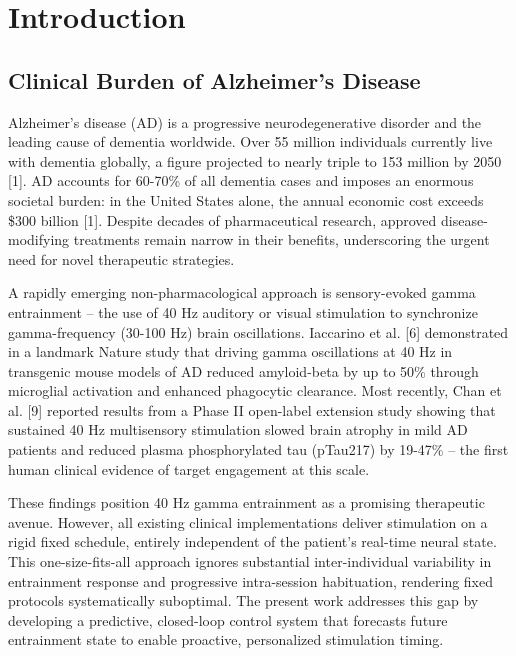 \documentclass[11pt,letterpaper]{article}
\begin{document}
\section{Introduction}

\subsection{Clinical Burden of Alzheimer's Disease}

Alzheimer's disease (AD) is a progressive neurodegenerative disorder and the leading cause of dementia worldwide. Over 55 million individuals currently live with dementia globally, a figure projected to nearly triple to 153 million by 2050 [1]. AD accounts for 60-70\% of all dementia cases and imposes an enormous societal burden: in the United States alone, the annual economic cost exceeds \$300 billion [1]. Despite decades of pharmaceutical research, approved disease-modifying treatments remain narrow in their benefits, underscoring the urgent need for novel therapeutic strategies.

A rapidly emerging non-pharmacological approach is sensory-evoked gamma entrainment -- the use of 40 Hz auditory or visual stimulation to synchronize gamma-frequency (30-100 Hz) brain oscillations. Iaccarino et al. [6] demonstrated in a landmark Nature study that driving gamma oscillations at 40 Hz in transgenic mouse models of AD reduced amyloid-beta by up to 50\% through microglial activation and enhanced phagocytic clearance. Most recently, Chan et al. [9] reported results from a Phase II open-label extension study showing that sustained 40 Hz multisensory stimulation slowed brain atrophy in mild AD patients and reduced plasma phosphorylated tau (pTau217) by 19-47\% -- the first human clinical evidence of target engagement at this scale.

These findings position 40 Hz gamma entrainment as a promising therapeutic avenue. However, all existing clinical implementations deliver stimulation on a rigid fixed schedule, entirely independent of the patient's real-time neural state. This one-size-fits-all approach ignores substantial inter-individual variability in entrainment response and progressive intra-session habituation, rendering fixed protocols systematically suboptimal. The present work addresses this gap by developing a predictive, closed-loop control system that forecasts future entrainment state to enable proactive, personalized stimulation timing.
\end{document}
